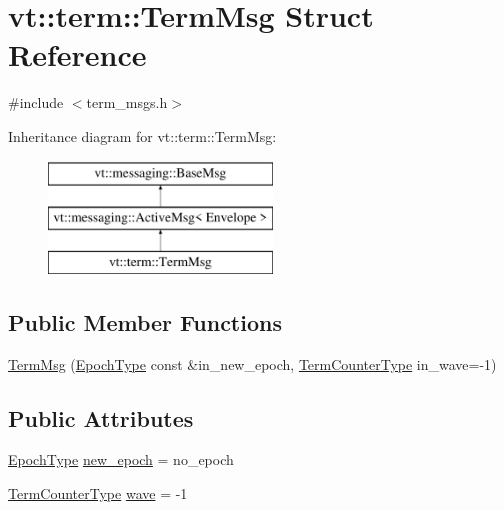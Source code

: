 \hypertarget{structvt_1_1term_1_1_term_msg}{}\section{vt\+:\+:term\+:\+:Term\+Msg Struct Reference}
\label{structvt_1_1term_1_1_term_msg}


{\ttfamily \#include $<$term\+\_\+msgs.\+h$>$}

Inheritance diagram for vt\+:\+:term\+:\+:Term\+Msg\+:\begin{figure}[H]
\begin{center}
\leavevmode
\includegraphics[height=3.000000cm]{structvt_1_1term_1_1_term_msg}
\end{center}
\end{figure}
\subsection*{Public Member Functions}
\begin{DoxyCompactItemize}
\item 
\hyperlink{structvt_1_1term_1_1_term_msg_a099cbed49c4d73d9627c20463334db39}{Term\+Msg} (\hyperlink{namespacevt_a985a5adf291c34a3ca263b3378388236}{Epoch\+Type} const \&in\+\_\+new\+\_\+epoch, \hyperlink{namespacevt_1_1term_a4fd378cdb0c36683afc1b3399d685f7f}{Term\+Counter\+Type} in\+\_\+wave=-\/1)
\end{DoxyCompactItemize}
\subsection*{Public Attributes}
\begin{DoxyCompactItemize}
\item 
\hyperlink{namespacevt_a985a5adf291c34a3ca263b3378388236}{Epoch\+Type} \hyperlink{structvt_1_1term_1_1_term_msg_a1890be8aa1a0d1a148331d3c0ea229e3}{new\+\_\+epoch} = no\+\_\+epoch
\item 
\hyperlink{namespacevt_1_1term_a4fd378cdb0c36683afc1b3399d685f7f}{Term\+Counter\+Type} \hyperlink{structvt_1_1term_1_1_term_msg_a4090f02c6dae636a0c2b31c101532255}{wave} = -\/1
\end{DoxyCompactItemize}
